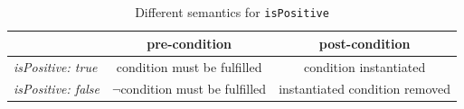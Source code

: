\documentclass{article}
\begin{document}
\begin{table}[ht]
	\caption{Different semantics for \texttt{isPositive}}
	\label{tab:is_positive}
	\begin{center}
		
		\begin{tabular}{lcc}
			\toprule
			& \textbf{pre-condition} & \textbf{post-condition} \\ 
			\midrule
			\emph{isPositive: true} & condition must be fulfilled & condition instantiated\\ 
			\emph{isPositive: false} & $\neg$condition must be fulfilled & instantiated condition removed \\ 
			\bottomrule
		\end{tabular}
	\end{center}
\end{table}


% 
% 
% 
% 
% 
% 
% 
% 
% 
\end{document}
